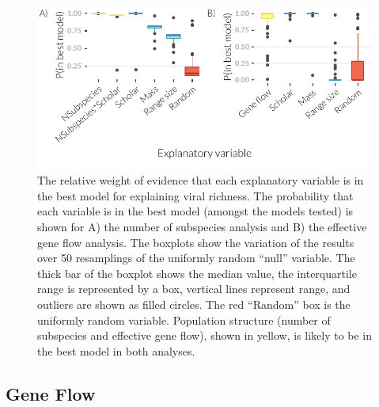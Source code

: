 \begin{knitrout}\footnotesize
{}\color{fgcolor}\begin{figure}[t]

{\centering \includegraphics[width=\textwidth]{figure/fstITPlots-1} 

}

\caption[Akaike variable weights]{
The relative weight of evidence that each explanatory variable is in the best model for explaining viral richness.
The probability that each variable is in the best model (amongst the models tested) is shown for A) the number of subspecies analysis and B) the effective gene flow analysis.
The boxplots show the variation of the results over 50 resamplings of the uniformly random ``null'' variable. 
The thick bar of the boxplot shows the median value, the interquartile range is represented by a box, vertical lines represent range, and outliers are shown as filled circles.
The red ``Random'' box is the uniformly random variable. 
Population structure (number of subspecies and effective gene flow), shown in yellow, is likely to be in the best model in both analyses.}\label{fig:fstITPlots}
\end{figure}


\end{knitrout}





\subsection{Gene Flow}


